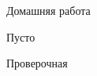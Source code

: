 \begin{homework}[number=3]
	\begin{listofex}
		\item Домашняя работа
	\end{listofex}
\end{homework}

\begin{class}[number=4]
	\begin{listofex}
		\item Пусто
	\end{listofex}
\end{class}


\begin{exam}
	\begin{listofex}
		\item Проверочная
	\end{listofex}
\end{exam}
